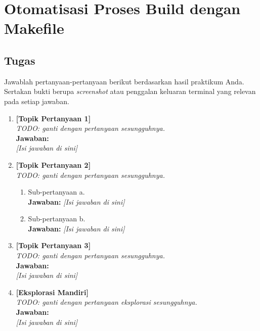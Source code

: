 
\chapter{Otomatisasi Proses Build dengan Makefile}
\label{chap:handson-03}

\section{Tugas}

Jawablah pertanyaan-pertanyaan berikut berdasarkan hasil praktikum Anda.
Sertakan bukti berupa \textit{screenshot} atau penggalan keluaran terminal
yang relevan pada setiap jawaban.

\begin{enumerate}
    \item \textbf{[Topik Pertanyaan 1]}\\
    \textit{TODO: ganti dengan pertanyaan sesungguhnya.}\\[0.3cm]
    \textbf{Jawaban:}\\
    \textit{[Isi jawaban di sini]}

    \item \textbf{[Topik Pertanyaan 2]}\\
    \textit{TODO: ganti dengan pertanyaan sesungguhnya.}
    \begin{enumerate}
        \item[(a)] Sub-pertanyaan a.\\
        \textbf{Jawaban:} \textit{[Isi jawaban di sini]}
        \item[(b)] Sub-pertanyaan b.\\
        \textbf{Jawaban:} \textit{[Isi jawaban di sini]}
    \end{enumerate}

    \item \textbf{[Topik Pertanyaan 3]}\\
    \textit{TODO: ganti dengan pertanyaan sesungguhnya.}\\[0.3cm]
    \textbf{Jawaban:}\\
    \textit{[Isi jawaban di sini]}

    \item \textbf{[Eksplorasi Mandiri]}\\
    \textit{TODO: ganti dengan pertanyaan eksplorasi sesungguhnya.}\\[0.3cm]
    \textbf{Jawaban:}\\
    \textit{[Isi jawaban di sini]}
\end{enumerate}

